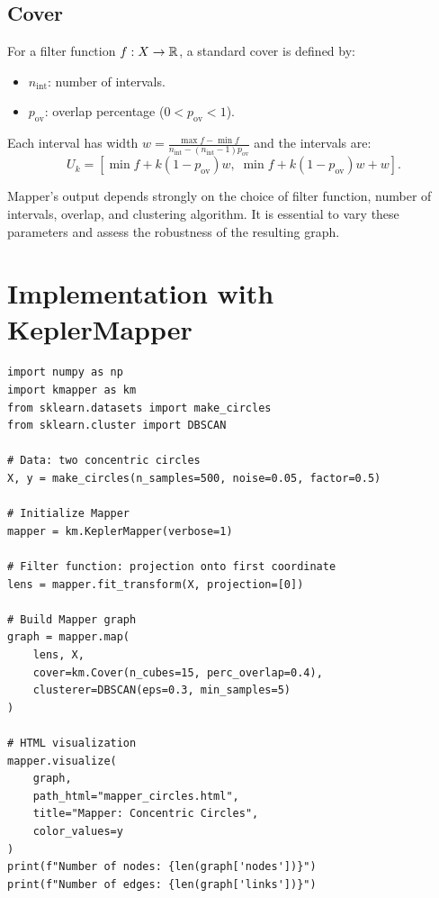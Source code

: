 \subsection{Cover}

\begin{definition}
For a filter function $f : X \to \mathbb{R}$, a standard cover is defined by:
\begin{itemize}
  \item $n_{\mathrm{int}}$: number of intervals.
  \item $p_{\mathrm{ov}}$: overlap percentage ($0 < p_{\mathrm{ov}} < 1$).
\end{itemize}
Each interval has width
$w = \frac{\max f - \min f}{n_{\mathrm{int}} - (n_{\mathrm{int}} - 1) p_{\mathrm{ov}}}$
and the intervals are:
\[
  U_k = [\min f + k(1 - p_{\mathrm{ov}})w,\;
         \min f + k(1 - p_{\mathrm{ov}})w + w].
\]
\end{definition}

\begin{warning}[title=\textbf{Parameter Sensitivity}]
Mapper's output depends strongly on the choice of filter function,
number of intervals, overlap, and clustering algorithm. It is essential
to vary these parameters and assess the robustness of the resulting
graph.
\end{warning}

\section{Implementation with KeplerMapper}

\begin{codeblock}[title=\textbf{Mapper with KeplerMapper}]
\begin{verbatim}
import numpy as np
import kmapper as km
from sklearn.datasets import make_circles
from sklearn.cluster import DBSCAN

# Data: two concentric circles
X, y = make_circles(n_samples=500, noise=0.05, factor=0.5)

# Initialize Mapper
mapper = km.KeplerMapper(verbose=1)

# Filter function: projection onto first coordinate
lens = mapper.fit_transform(X, projection=[0])

# Build Mapper graph
graph = mapper.map(
    lens, X,
    cover=km.Cover(n_cubes=15, perc_overlap=0.4),
    clusterer=DBSCAN(eps=0.3, min_samples=5)
)

# HTML visualization
mapper.visualize(
    graph,
    path_html="mapper_circles.html",
    title="Mapper: Concentric Circles",
    color_values=y
)
print(f"Number of nodes: {len(graph['nodes'])}")
print(f"Number of edges: {len(graph['links'])}")
\end{verbatim}
\end{codeblock}

